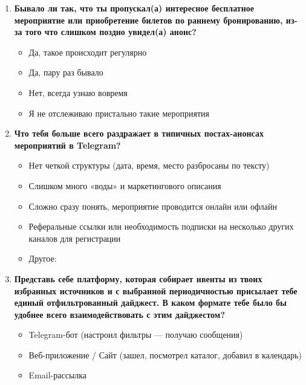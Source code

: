 \begin{enumerate}
    \vspace{1em}

    \item \textbf{Бывало ли так, что ты пропускал(а) интересное бесплатное мероприятие или приобретение билетов по раннему бронированию, из-за того что слишком поздно увидел(а) анонс?}
    \begin{itemize}
        \item[$\bigcirc$] Да, такое происходит регулярно
        \item[$\bigcirc$] Да, пару раз бывало
        \item[$\bigcirc$] Нет, всегда узнаю вовремя
        \item[$\bigcirc$] Я не отслеживаю пристально такие мероприятия
    \end{itemize}

    \vspace{1em}

    \item \textbf{Что тебя больше всего раздражает в типичных постах-анонсах мероприятий в Telegram?}
    \begin{itemize}
        \item[$\square$] Нет четкой структуры (дата, время, место разбросаны по тексту)
        \item[$\square$] Слишком много «воды» и маркетингового описания
        \item[$\square$] Сложно сразу понять, мероприятие проводится онлайн или офлайн
        \item[$\square$] Реферальные ссылки или необходимость подписки на несколько других каналов для регистрации
        \item[$\square$] Другое: \hrulefill
    \end{itemize}

    \vspace{1em}

    \item \textbf{Представь себе платформу, которая собирает ивенты из твоих избранных источников и с выбранной периодичностью присылает тебе единый отфильтрованный дайджест. В каком формате тебе было бы удобнее всего взаимодействовать с этим дайджестом?}
    \begin{itemize}
        \item[$\square$] Telegram-бот (настроил фильтры --- получаю сообщения)
        \item[$\square$] Веб-приложение / Сайт (зашел, посмотрел каталог, добавил в календарь)
        \item[$\square$] Email-рассылка
    \end{itemize}


\end{enumerate}
